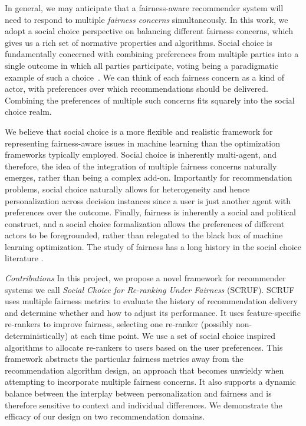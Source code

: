 In general, we may anticipate that a fairness-aware recommender system will need to respond to multiple \textit{fairness concerns} simultaneously. In this work, we adopt a social choice perspective \cite{BCELP16a} on balancing different fairness concerns, which gives us a rich set of normative properties and algorithms. Social choice is fundamentally concerned with combining preferences from multiple parties into a single outcome in which all parties participate, voting being a paradigmatic example of such a choice~\cite{Zwicker:Voting}. We can think of each fairness concern as a kind of actor, with preferences over which recommendations should be delivered. Combining the preferences of multiple such concerns fits squarely into the social choice realm.

We believe that social choice is a more flexible and realistic framework for representing fairness-aware issues in machine learning than the optimization frameworks typically employed. Social choice is inherently multi-agent, and therefore, the idea of the integration of multiple fairness concerns naturally emerges, rather than being a complex add-on. Importantly for recommendation problems, social choice naturally allows for heterogeneity and hence personalization across decision instances since a user is just another agent with preferences over the outcome. Finally, fairness is inherently a social and political construct, and a social choice formalization allows the preferences of different actors to be foregrounded, rather than relegated to the black box of machine learning optimization. The study of fairness has a long history in the social choice literature \cite{Young:Equity,Zwicker:Voting}.

\noindent\textit{Contributions} In this project, we propose a novel framework for recommender systems we call \textit{Social Choice for Re-ranking Under Fairness} (SCRUF). SCRUF uses multiple fairness metrics to evaluate the history of recommendation delivery and determine whether and how to adjust its performance. It uses feature-specific re-rankers to improve fairness, selecting one re-ranker (possibly non-deterministically) at each time point. We use a set of social choice inspired algorithms to allocate re-rankers to users based on the user preferences. This framework abstracts the particular fairness metrics away from the recommendation algorithm design, an approach that becomes unwieldy when attempting to incorporate multiple fairness concerns. It also supports a dynamic balance between the interplay between personalization and fairness and is therefore sensitive to context and individual differences. We demonstrate the efficacy of our design on two recommendation domains.

